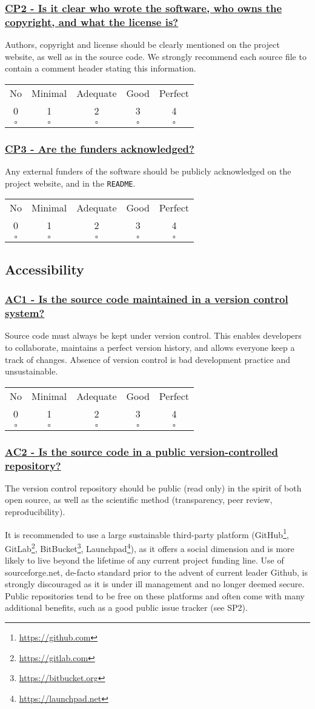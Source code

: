 \documentclass[a4paper,11pt]{article}
\newcommand{\criterion}[2]{\subsubsection*{\underline{#1 - #2}}\label{id:#1}}
\newcommand\CheckTable{%
  \begin{tabular}{ccccc}
    No & Minimal & Adequate & Good & Perfect \\
    0 & 1 & 2 & 3 & 4 \\
    \hline
    $\square$ & $\square$ & $\square$ & $\square$ & $\square$ \\
  \end{tabular}%
}
\begin{document}
\newcommand{\cpTwoID}{CP2}
\newcommand{\cpTwoText}{Is it clear who wrote the software, who owns the copyright, and what the license is?}
\criterion{\cpTwoID}{\cpTwoText}

Authors, copyright and license should be clearly mentioned on the project
website, as well as in the source code.  We strongly recommend each source file to contain a comment header stating this information.

\CheckTable

\newcommand{\cpThreeID}{CP3}
\newcommand{\cpThreeText}{Are the funders acknowledged?}
\criterion{\cpThreeID}{\cpThreeText}

Any external funders of the software should be publicly acknowledged on the project
website, and in the \texttt{README}.

\CheckTable

\subsection{Accessibility}\label{sec:acc}

\newcommand{\acOneID}{AC1}
\newcommand{\acOneText}{Is the source code maintained in a version control system?}
\criterion{\acOneID}{\acOneText}

Source code must always be kept under version control. This enables developers
to collaborate, maintains a perfect version history, and allows everyone keep a
track of changes. Absence of version control is bad development practice and
unsustainable.

\CheckTable

\newcommand{\acTwoID}{AC2}
\newcommand{\acTwoText}{Is the source code in a public version-controlled repository?}
\criterion{\acTwoID}{\acTwoText}

The version control repository should be public (read only) in the spirit of both open
source, as well as the scientific method (transparency, peer review,
reproducibility). 

It is recommended to use a large sustainable third-party platform
(GitHub\footnote{\url{https://github.com}},
GitLab\footnote{\url{https://gitlab.com}},
BitBucket\footnote{\url{https://bitbucket.org}},
Launchpad\footnote{\url{https://launchpad.net}}), as it offers a social
dimension and is more likely to live beyond the lifetime of any current project
funding line. Use of sourceforge.net, de-facto standard prior to the advent of
current leader Github, is strongly discouraged as it is under ill management
and no longer deemed secure. Public repositories tend to be free on these platforms and
often come with many additional benefits, such as a good public issue tracker
(see SP2).
\end{document}
